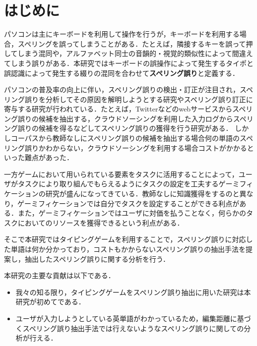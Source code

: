 \documentclass{jarticle}
\begin{document}
\mktitle
%
\renewcommand{\baselinestretch}{1.1}\small
%

\section{はじめに}
\fontsize{9.37pt}{1pt}\selectfont
パソコンは主にキーボードを利用して操作を行うが，キーボードを利用する場合，スペリングを誤ってしまうことがある．たとえば，隣接するキーを誤って押してしまう混同や，アルファベット同士の音韻的・視覚的類似性によって間違えてしまう誤りがある．本研究ではキーボードの誤操作によって発生するタイポと誤認識によって発生する綴りの混同を合わせて\textbf{スペリング誤り}と定義する．

パソコンの普及率の向上に伴い，スペリング誤りの検出・訂正が注目され，スペリング誤りを分析してその原因を解明しようとする研究やスペリング誤り訂正に寄与する研究が行われている．たとえば，Twitterなどのwebサービスからスペリング誤りの候補を抽出する\cite{aramakiNLP2010}，クラウドソーシングを利用した入力ログからスペリング誤りの候補を得る\cite{babaACL2012}などしてスペリング誤りの獲得を行う研究がある．
しかしコーパスから教師なしにスペリング誤りの候補を抽出する場合何の単語のスペリング誤りかわからない，クラウドソーシングを利用する場合コストがかかるといった難点があった．

一方ゲームにおいて用いられている要素をタスクに活用することによって，ユーザがタスクにより取り組んでもらえるようにタスクの設定を工夫するゲーミフィケーションの研究が盛んになってきている\cite{deterdingACM2011}．教師なしに知識獲得をするのと異なり，ゲーミフィケーションでは自分でタスクを設定することができる利点がある．また，ゲーミフィケーションではユーザに対価を払うことなく，何らかのタスクにおいてのリソースを獲得できるという利点がある．

そこで本研究ではタイピングゲームを利用することで，スペリング誤りに対応した単語は何か分かっており，コストもかからないスペリング誤りの抽出手法を提案し，抽出したスペリング誤りに関する分析を行う．

本研究の主要な貢献は以下である．

\begin{itemize}
 \item 我々の知る限り，タイピングゲームをスペリング誤り抽出に用いた研究は本研究が初めてである．
 \item ユーザが入力しようとしている英単語がわかっているため，編集距離に基づくスペリング誤り抽出手法\cite{aramakiNLP2010}では行えないようなスペリング誤りに関しての分析が行える．
\end{itemize}
\end{document}
